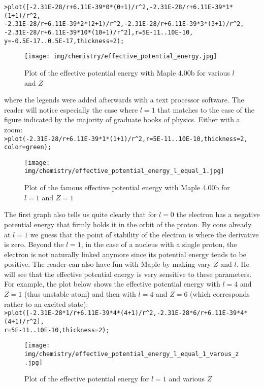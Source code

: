 	\texttt{>plot([-2.31E-28/r+6.11E-39*0*(0+1)/r\string^2,-2.31E-28/r+6.11E-39*1*(1+1)/r\string^2,\\-2.31E-28/r+6.11E-39*2*(2+1)/r\string^2,-2.31E-28/r+6.11E-39*3*(3+1)/r\string^2,\\-2.31E-28/r+6.11E-39*10*(10+1)/r\string^2],r=5E-11..10E-10,\\y=-0.5E-17..0.5E-17,thickness=2);}
	\begin{figure}[H]
		\begin{center}
		\texttt{[image: img/chemistry/effective\_potential\_energy.jpg]}
		\end{center}	
		\caption{Plot of the effective potential energy with Maple 4.00b for various $l$ and $Z$}
	\end{figure}
	where the legends were added afterwards with a text processor software. The reader will notice especially the case where $l=1$ that matches to the case of the figure indicated by the majority of graduate books of physics. Either with a zoom:\\

	\texttt{>plot(-2.31E-28/r+6.11E-39*1*(1+1)/r\string^2,r=5E-11..10E-10,thickness=2, color=green);}
	\begin{figure}[H]
		\begin{center}
		\texttt{[image: img/chemistry/effective\_potential\_energy\_l\_equal\_1.jpg]}
		\end{center}	
		\caption{Plot of the famous effective potential energy with Maple 4.00b for  $l=1$ and $Z=1$}
	\end{figure}

	The first graph also tells us quite clearly that for $l= 0$ the electron has a negative potential energy that firmly holds it in the orbit of the proton. By cons already at $l= 1$ we guess that the point of stability of the electron is where the derivative is zero. Beyond the $l= 1$, in the case of a nucleus with a single proton, the electron is not naturally linked anymore since its potential energy tends to be positive. The reader can also have fun with Maple by making vary $Z$ and $l$. He will see that the effective potential energy is very sensitive to these parameters. For example, the plot below shows the effective potential energy with $l= 4$ and $Z = 1$ (thus unstable atom) and then with $l = 4$ and $Z = 6$ (which corresponds rather to an excited state):\\

	\texttt{>plot([-2.31E-28*1/r+6.11E-39*4*(4+1)/r\string^2,-2.31E-28*6/r+6.11E-39*4*(4+1)/r\string^2],\\r=5E-11..10E-10,thickness=2);}
	\begin{figure}[H]
		\begin{center}
		\texttt{[image: img/chemistry/effective\_potential\_energy\_l\_equal\_1\_varous\_z.jpg]}
		\end{center}	
		\caption{Plot of the effective potential energy for $l=1$ and various $Z$}
	\end{figure}
	
